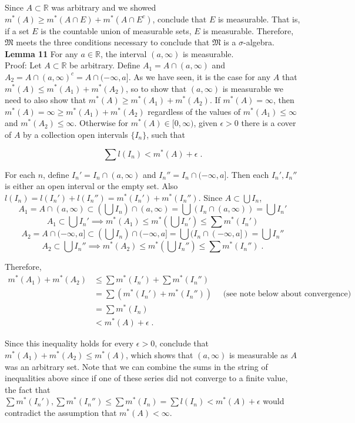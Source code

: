 \documentclass[a4paper]{article}
\begin{document}
Since $A\subset \mathbb{R}$ was arbitrary and we showed $m^*(A) \geq m^*(A \cap E) + m^*(A \cap E^c)$, conclude that $E$ is measurable. That is, if a set $E$ is the countable union of measurable sets, $E$ is measurable. Therefore, $\mathfrak{M}$ meets the three conditions necessary to conclude that $\mathfrak{M}$ is a $\sigma$-algebra. \\

{\bf Lemma 11} For any $a \in \mathbb{R}$, the interval $(a,\infty)$ is measurable. \\

Proof: Let $A\subset \mathbb{R}$ be arbitrary. Define $A_1 = A\cap (a,\infty)$ and $A_2 = A \cap (a, \infty)^c = A\cap (-\infty,a]$. As we have seen, it is the case for any $A$ that $m^*(A) \leq m^*(A_1) + m^*(A_2)$, so to show that $(a,\infty)$ is measurable we need to also show that $m^*(A) \geq m^*(A_1) + m^*(A_2)$. If $m^*(A) = \infty$, then $m^*(A) = \infty \geq  m^*(A_1) + m^*(A_2)$ regardless of the values of $m^*(A_1)\leq \infty$ and $m^*(A_2) \leq \infty$. Otherwise for $m^*(A) \in [0,\infty)$, given $\epsilon > 0$ there is a cover of $A$ by a collection open intervals $\{I_n\}$, such that 

$$ \sum l(I_n) < m^*(A) + \epsilon \;.$$

For each $n$, define $I_n' = I_n \cap (a,\infty)$ and $I_n'' = I_n \cap (-\infty, a]$. Then each $I_n',I_n''$ is either an open interval or the empty set. Also $l(I_n) = l(I_n') + l(I_n'') = m^*(I_n') + m^*(I_n'')$. Since $A \subset \bigcup I_n$, 
$$A_1 = A \cap (a,\infty) \subset \left(\bigcup I_n \right) \cap (a,\infty) = \bigcup (I_n \cap (a,\infty)) = \bigcup I_n' $$
$$A_1 \subset \bigcup I_n' \implies m^*(A_1) \leq m^*\left(\bigcup I_n'\right) \leq \sum m^*(I_n')$$
$$A_2 = A\cap (-\infty,a] \subset \left(\bigcup I_n \right) \cap (-\infty, a] = \bigcup (I_n \cap (-\infty,a]) = \bigcup I_n''$$
$$A_2 \subset \bigcup I_n'' \implies m^*(A_2) \leq m^*\left(\bigcup I_n''\right) \leq \sum m^*(I_n'') \;.$$

Therefore,
\begin{align*}
m^*(A_1) + m^*(A_2) &\leq \sum m^*(I_n') + \sum m^*(I_n'') \\
&= \sum \left(m^*(I_n') + m^*(I_n'')\right) \quad \text{ (see note below about convergence)}\\
&= \sum m^*(I_n)\\
&< m^*(A) + \epsilon \;.
\end{align*}

Since this inequality holds for every $\epsilon > 0$, conclude that $m^*(A_1) + m^*(A_2) \leq m^*(A)$, which shows that $(a,\infty)$ is measurable as $A$ was an arbitrary set. Note that we can combine the sums in the string of inequalities above since if one of these series did not converge to a finite value, the fact that $\sum m^*(I_n'), \sum m^*(I_n'') \leq \sum m^*(I_n) = \sum l(I_n) < m^*(A) + \epsilon$ would contradict the assumption that $m^*(A) < \infty$. \\
\end{document}
